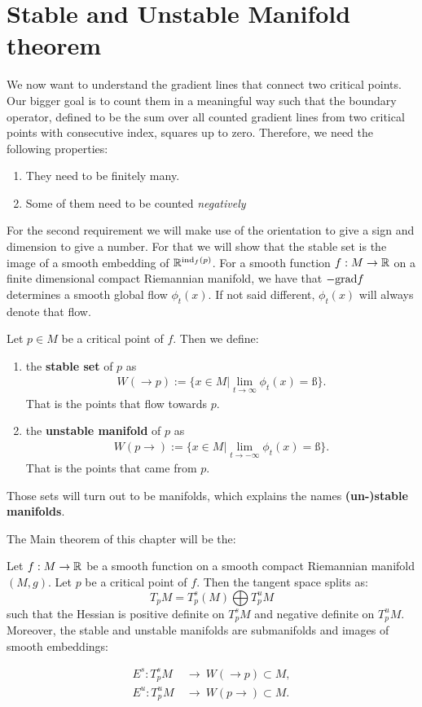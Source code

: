 \section{Stable and Unstable Manifold theorem}
We now want to understand the gradient lines that connect two critical points. Our bigger goal is to count them in a meaningful way such that the boundary operator, defined to be the sum over all counted gradient lines from two critical points with consecutive index, squares up to zero. Therefore, we need the following properties:
\begin{enumerate}
	\item They need to be finitely many.
	\item Some of them need to be counted \textit{negatively}
\end{enumerate}
For the second requirement we will make use of the orientation to give a sign and dimension to give a number. For that we will show that the stable set is the image of a smooth embedding of $\mathbb{R}^{\mathrm{ind}_f(p)}$. 
For a smooth function $f:M\to \mathbb{R}$ on a finite dimensional compact Riemannian manifold, we have that $-\mathrm{grad} f$ determines a smooth global flow $\phi_t(x)$. If not said different, $\phi_t(x)$ will always denote that flow.
\begin{definition} Let $p\in M$ be a critical point of $f$. Then we define:
	\begin{enumerate}
		\item the \textbf{stable set} of $p$ as 
		\begin{align*}
			W(\to p):=\{x\in M| \lim_{t\to \infty} \phi_t(x)=ß\}.
		\end{align*} That is the points that flow towards $p$.
		\item the \textbf{unstable manifold} of $p$ as 
		\begin{align*}
			W(p\to):=\{x\in M| \lim_{t\to -\infty} \phi_t(x)=ß\}.  
		\end{align*} That is the points that came from $p$. 
	\end{enumerate}
	Those sets will turn out to be manifolds, which explains the names \textbf{(un-)stable manifolds}.
\end{definition} 
The Main theorem of this chapter will be the:
\begin{theorem} \label{thm: stable and unstable manifold theorem}
	Let $f:M\to \mathbb{R}$ be a smooth function on a smooth compact Riemannian manifold $(M,g)$. Let $p$ be a critical point of $f$. Then the tangent space splits as:
	\begin{equation*}
		T_pM=T^s_p(M) \bigoplus T^u_pM
	\end{equation*} such that the Hessian is positive definite on $T^s_pM$ and negative definite on $T^u_pM$. Moreover, the stable and unstable manifolds are submanifolds and images of smooth embeddings: 
	
	\begin{align*}
		E^s:T^s_pM ~ &\to ~  W(\to p) \subset M, \\
		E^u:T^u_pM~&\to~     W(p \to) \subset M.
	\end{align*}
\end{theorem}
